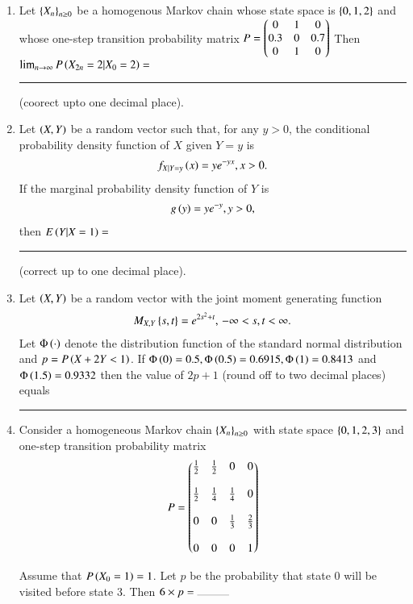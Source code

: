 \documentclass[journal,12pt,onecolumn]{IEEEtran}
\theoremstyle{remark}
\begin{document}
\begin{enumerate}
\item Let $\left\{X_n\right\}_{n\geq 0}$ be a homogenous Markov chain whose state space is $\left\{0, 1, 2\right\}$ and whose one-step transition probability matrix
$P=\begin{pmatrix} 0 & 1 & 0 \\
	   0.3 & 0 & 0.7 \\
	   0 & 1 & 0\end{pmatrix}$ Then $\lim_{n\to \infty}P\left(X_{2n}=2 \vert X_{0} =2\right)=$ \rule{1cm}{0.2pt} (coorect upto one decimal place).

\item Let $\left(X, Y\right)$ be a random vector such that, for any $y>0$, the conditional probability density function of $X$ given $Y=y$ is
	\begin{align*}
		f_{X|Y=y}\left(x\right) = y e^{-yx}, x > 0.
	\end{align*}
If the marginal probability density function of $Y$ is
	\begin{align*}
		g\left(y\right) = y e^{-y}, y > 0,
	\end{align*}
then $E\left(Y|X=1\right)=$ \rule{1cm}{0.2pt} (correct up to one decimal place).

\item Let $\left(X, Y\right)$ be a random vector with the joint moment generating function
	\begin{align*}
         M_{X,Y}\left\{s, t\right\} = e^{2s^2 + t}, \, -\infty < s, t < \infty.
	\end{align*}
     Let $\Phi\left(\cdot\right)$ denote the distribution function of the standard normal distribution and $p=P\left(X+2Y<1\right)$. If $\Phi\left(0\right)=0.5, \Phi\left(0.5\right)=0.6915, \Phi\left(1\right)=0.8413$ and $\Phi\left(1.5\right)=0.9332$ then the value of $2p+1$ (round off to two decimal places) equals \rule{1cm}{0.2pt}

\item Consider a homogeneous Markov chain $ \left\{X_n\right\}_{n \geq 0} $ with state space $ \left\{ 0, 1, 2, 3 \right\} $ and one-step transition probability matrix
	\begin{align*}
	P =  \begin{pmatrix} \frac{1}{2} & \frac{1}{2} & 0 & 0 \\ \\
		  \frac{1}{2} & \frac{1}{4} & \frac{1}{4} & 0 \\ \\
		   0 & 0 & \frac{1}{3} & \frac{2}{3} \\ \\
			0 & 0 & 0 & 1\end{pmatrix}
	\end{align*}
	

 Assume that $ P\left(X_0 = 1\right) = 1 $. Let $ p $ be the probability that state 0 will be visited before state 3. Then $ 6 \times p = \rule{1cm}{0.2pt} $


\end{enumerate}
\end{document}
